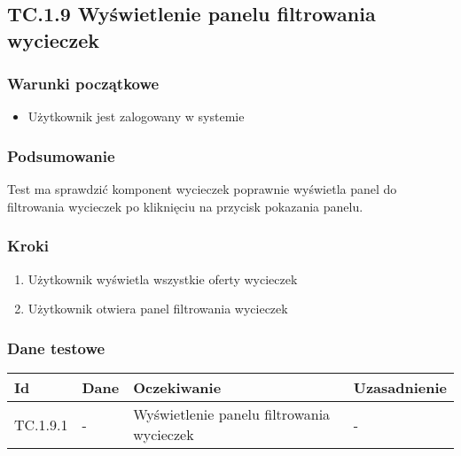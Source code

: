 \documentclass[a4paper,15pt]{article}
\begin{document}
\newpage
\begin{framed}
\subsection{TC.1.9 Wyświetlenie panelu filtrowania wycieczek}


\vspace{0.5cm}

\subsubsection{Warunki początkowe}
\begin{itemize}
\item Użytkownik jest zalogowany w systemie
\end{itemize}

\subsubsection{Podsumowanie}
Test ma sprawdzić komponent wycieczek poprawnie wyświetla panel do filtrowania wycieczek po kliknięciu na przycisk pokazania panelu. 

\subsubsection{Kroki}
\begin{enumerate}
\item Użytkownik wyświetla wszystkie oferty wycieczek
\item Użytkownik otwiera panel filtrowania wycieczek
\end{enumerate}

\subsubsection{Dane testowe}

\begin{center}
\begin{tabular}{ |C{1.5cm}|C{3cm}|C{4cm}|C{4cm}| } 
 \hline
 \textbf{Id} & \textbf{Dane} & \textbf{Oczekiwanie} & \textbf{Uzasadnienie} \\ \hline
 TC.1.9.1 & - & Wyświetlenie panelu filtrowania wycieczek & - \\ \hline
\end{tabular}
\end{center}

\end{framed}
\end{document}
